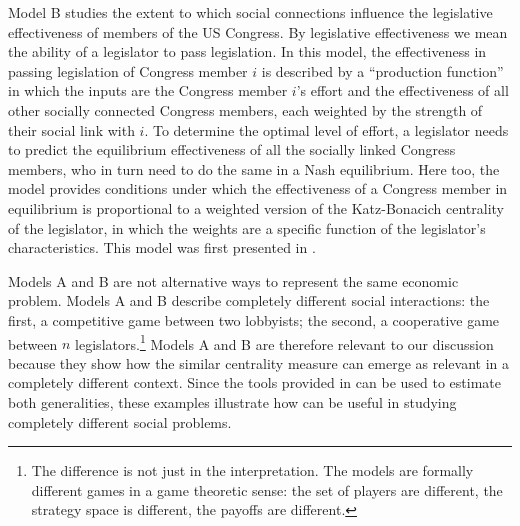 \documentclass[nojss]{jss}
\begin{document}
Model B studies the extent to which social connections influence the
legislative effectiveness of members of the US Congress.  By legislative
effectiveness we mean the ability of a legislator to pass legislation.  In
this model, the effectiveness in passing legislation of Congress member
$i$ is described by a ``production function'' in which the inputs are
the Congress member $i$'s effort and the effectiveness of all other
socially connected Congress members, each weighted by the strength of their
social link with $i$.  To determine the optimal level of effort, a
legislator needs to predict the equilibrium effectiveness of all the
socially linked Congress members, who in turn need to do the same in a Nash
equilibrium.  Here too, the model provides conditions under which the
effectiveness of a Congress member in equilibrium is proportional to a
weighted version of the Katz-Bonacich centrality of the legislator, in which
the weights are a specific function of the legislator's characteristics. 
This model was first presented in
\cite{Battaglini+Sciabolazza+Patacchini:2020}.

Models A and B are not alternative ways to represent the same economic
problem.  Models A and B describe completely different social interactions:
the first, a competitive game between two lobbyists; the second, a
cooperative game between $n$ legislators.\footnote{The difference is
not just in the interpretation.  The models are formally different games in
a game theoretic sense: the set of players are different, the strategy space
is different, the payoffs are different.} Models A and B are therefore
relevant to our discussion because they show how the similar centrality
measure can emerge as relevant in a completely different context.  Since the
tools provided in  can be used to estimate both generalities,
these examples illustrate how  can be useful in studying
completely different social problems.
\end{document}
